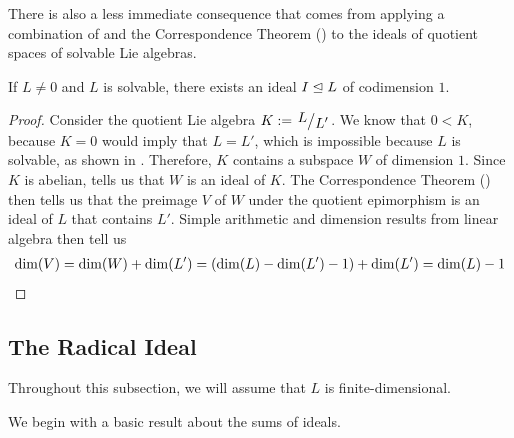 There is also a less immediate consequence that comes from applying a combination of  and the Correspondence Theorem () to the ideals of quotient spaces of solvable Lie algebras.

\begin{boxcorollary}\label{Ch1:Cor:ExistsIdealCodim1}
If $L \neq 0$ and $L$ is solvable, there exists an ideal $I \trianglelefteq L$ of codimension $1$.
\end{boxcorollary}
\begin{proof}
    Consider the quotient Lie algebra $K := \quotient{L}{L'}$. We know that $0 < K$, because $K = 0$ would imply that $L = L'$, which is impossible because $L$ is solvable, as shown in . Therefore, $K$ contains a subspace $W$ of dimension $1$. Since $K$ is abelian,  tells us that $W$ is an ideal of $K$. The Correspondence Theorem () then tells us that the preimage $V$ of $W$ under the quotient epimorphism is an ideal of $L$ that contains $L'$. Simple arithmetic and dimension results from linear algebra then tell us
    \begin{align*}
        \dim\!\left( V \right) = \dim\!\left( W \right) + \dim\!\left( L' \right) = \left( \dim\!\left( L \right) - \dim\!\left( L' \right) - 1 \right) + \dim\!\left( L' \right) = \dim\!\left( L \right) - 1
    \end{align*}
\end{proof}


\subsection{The Radical Ideal}

Throughout this subsection, we will assume that $L$ is finite-dimensional.

We begin with a basic result about the sums of ideals.

